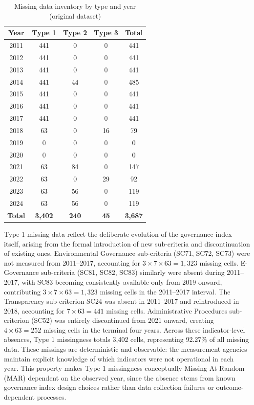 \documentclass[12pt,a4paper]{article}
\begin{document}
\begin{table}[!ht]
\centering
\caption{Missing data inventory by type and year (original dataset)}
\label{tab:missing_by_type}
\small
\begin{tabular}{c c c c c}
\toprule
\textbf{Year} & \textbf{Type 1} & \textbf{Type 2} & \textbf{Type 3} & \textbf{Total} \\
\midrule
2011 & 441 & 0 & 0 & 441 \\
2012 & 441 & 0 & 0 & 441 \\
2013 & 441 & 0 & 0 & 441 \\
2014 & 441 & 44 & 0 & 485 \\
2015 & 441 & 0 & 0 & 441 \\
2016 & 441 & 0 & 0 & 441 \\
2017 & 441 & 0 & 0 & 441 \\
2018 & 63 & 0 & 16 & 79 \\
2019 & 0 & 0 & 0 & 0 \\
2020 & 0 & 0 & 0 & 0 \\
2021 & 63 & 84 & 0 & 147 \\
2022 & 63 & 0 & 29 & 92 \\
2023 & 63 & 56 & 0 & 119 \\
2024 & 63 & 56 & 0 & 119 \\
\midrule
\textbf{Total} & \textbf{3,402} & \textbf{240} & \textbf{45} & \textbf{3,687} \\
\bottomrule
\end{tabular}
\end{table}

\FloatBarrier

Type 1 missing data reflect the deliberate evolution of the governance index itself, arising from the formal introduction of new sub-criteria and discontinuation of existing ones. Environmental Governance sub-criteria (SC71, SC72, SC73) were not measured from 2011--2017, accounting for $3 \times 7 \times 63 = 1,323$ missing cells. E-Governance sub-criteria (SC81, SC82, SC83) similarly were absent during 2011--2017, with SC83 becoming consistently available only from 2019 onward, contributing $3 \times 7 \times 63 = 1,323$ missing cells in the 2011--2017 interval. The Transparency sub-criterion SC24 was absent in 2011--2017 and reintroduced in 2018, accounting for $7 \times 63 = 441$ missing cells. Administrative Procedures sub-criterion (SC52) was entirely discontinued from 2021 onward, creating $4 \times 63 = 252$ missing cells in the terminal four years. Across these indicator-level absences, Type 1 missingness totals 3,402 cells, representing 92.27\% of all missing data. These missings are deterministic and observable: the measurement agencies maintain explicit knowledge of which indicators were not operational in each year. This property makes Type 1 missingness conceptually Missing At Random (MAR) dependent on the observed year, since the absence stems from known governance index design choices rather than data collection failures or outcome-dependent processes.
\end{document}
